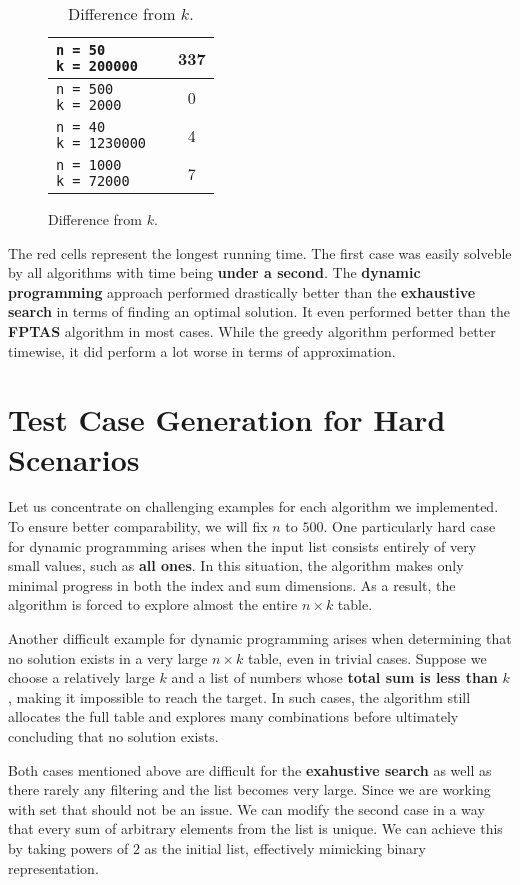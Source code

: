 \documentclass[11pt]{article}
\begin{document}
\begin{figure}[!hbpt]
\begin{minipage}{0.35\textwidth}
\begin{table}[H]
\begin{tabular}{|l|c|c|}
                \makecell[l]{ \texttt{n = 50} \\ \texttt{k = 200000}} &  \cellcolor{red!20}{19516} & 337 \\ \hline
                \makecell[l]{ \texttt{n = 500} \\ \texttt{k = 2000}} &  \cellcolor{red!20}{34} & 0 \\ \hline
                \makecell[l]{ \texttt{n = 40} \\ \texttt{k = 1230000}} &  \cellcolor{red!20}{33687} & 4 \\ \hline
                \makecell[l]{ \texttt{n = 1000} \\ \texttt{k = 72000}} & \cellcolor{red!20}{897} & 7 \\ \hline
            \end{tabular}
            \caption{Difference from $k$.}
        \end{table} 
    \end{minipage}  
\end{figure}

The red cells represent the longest running time. The first case was easily solveble by all algorithms with time being \textbf{under a second}. The \textbf{dynamic programming} approach performed drastically better than the \textbf{exhaustive search} in terms of finding an optimal solution. It even performed better than the \textbf{FPTAS} algorithm in most cases. While the greedy algorithm performed better timewise, it did perform a lot worse in terms of approximation.

\section{Test Case Generation for Hard Scenarios}

Let us concentrate on challenging examples for each algorithm we implemented. To ensure better comparability, we will fix $n$ to $500$. One particularly hard case for dynamic programming arises when the input list consists entirely of very small values, such as \textbf{all ones}. In this situation, the algorithm makes only minimal progress in both the index and sum dimensions. As a result, the algorithm is forced to explore almost the entire $n \times k$ table.

Another difficult example for dynamic programming arises when determining that no solution exists in a very large $n \times k$ table, even in trivial cases. Suppose we choose a relatively large $k$ and a list of numbers whose \textbf{total sum is less than} $k$, making it impossible to reach the target. In such cases, the algorithm still allocates the full table and explores many combinations before ultimately concluding that no solution exists. 

Both cases mentioned above are difficult for the \textbf{exahustive search} as well as there rarely any filtering and the list becomes very large. Since we are working with set that should not be an issue. We can modify the second case in a way that every sum of arbitrary elements from the list is unique. We can achieve this by taking powers of $2$ as the initial list, effectively mimicking binary representation.
\end{document}
